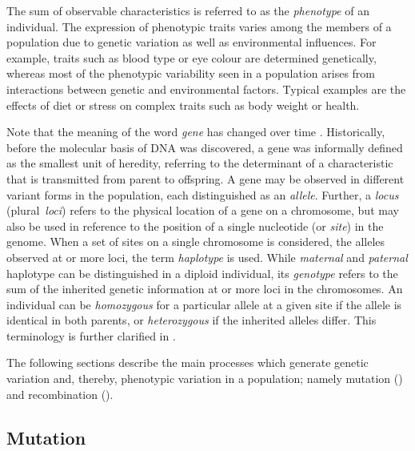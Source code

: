 The sum of observable characteristics is referred to as the \emph{phenotype} of an individual.
The expression of phenotypic traits varies among the members of a population due to genetic variation as well as environmental influences.
For example, traits such as blood type or eye colour are determined genetically, whereas most of the phenotypic variability seen in a population arises from interactions between genetic and environmental factors.
Typical examples are the effects of diet or stress on complex traits such as body weight or health.

%

%

Note that the meaning of the word \emph{gene} has changed over time \citep[\eg see][]{slack2014genes}.
Historically, before the molecular basis of DNA was discovered, a gene was informally defined as the smallest unit of heredity, referring to the determinant of a characteristic that is transmitted from parent to offspring.
A gene may be observed in different variant forms in the population, each distinguished as an \emph{allele}.
Further, a \emph{locus} (plural~\emph{loci}) refers to the physical location of a gene on a chromosome, but may also be used in reference to the position of a single nucleotide (or \emph{site}) in the genome.
When a set of sites on a single chromosome is considered, \ie the alleles observed at  or more loci, the term \emph{haplotype} is used.
While  \emph{maternal} and  \emph{paternal} haplotype can be distinguished in a diploid individual, its \emph{genotype} refers to the sum of the inherited genetic information at  or more loci in the  chromosomes.
An individual can be \emph{homozygous} for a particular allele at a given site if the allele is identical in both parents, or \emph{heterozygous} if the inherited alleles differ.
This terminology is further clarified in .

The following sections describe the main processes which generate genetic variation and, thereby, phenotypic variation in a population; namely mutation () and recombination ().


%
\subsection{Mutation}
\label{sec:mutation}
%


